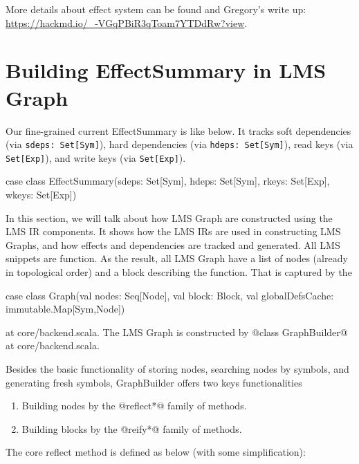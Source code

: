 More details about effect system can be found and Gregory's write up:
\url{https://hackmd.io/_-VGqPBiR3qToam7YTDdRw?view}.

\section{Building EffectSummary in LMS Graph}

Our fine-grained current EffectSummary is like below.
It tracks soft dependencies (via \texttt{sdeps: Set[Sym]}),
hard dependencies (via \texttt{hdeps: Set[Sym]}),
read keys (via \texttt{Set[Exp]}), and write keys (via \texttt{Set[Exp]}).

\begin{listing}[scala]
case class EffectSummary(sdeps: Set[Sym], hdeps: Set[Sym], rkeys: Set[Exp], wkeys: Set[Exp])
\end{listing}

In this section, we will talk about how LMS Graph are constructed using the LMS IR components.
It shows how the LMS IRs are used in constructing LMS Graphs, and how effects and dependencies are
tracked and generated.
All LMS snippets are function. As the result, all LMS Graph have a list of nodes
(already in topological order)
and a block describing the function. That is captured by the
\begin{listing}[scala]
case class Graph(val nodes: Seq[Node], val block: Block, val globalDefsCache: immutable.Map[Sym,Node])
\end{listing}
at core/backend.scala. The LMS Graph is constructed by @class GraphBuilder@ at core/backend.scala.

Besides the basic functionality of storing nodes, searching nodes by symbols, and generating fresh symbols,
GraphBuilder offers two keys functionalities

\begin{enumerate}
\item Building nodes by the @reflect*@ family of methods.
\item Building blocks by the @reify*@ family of methods.
\end{enumerate}

The core reflect method is defined as below (with some simplification):

